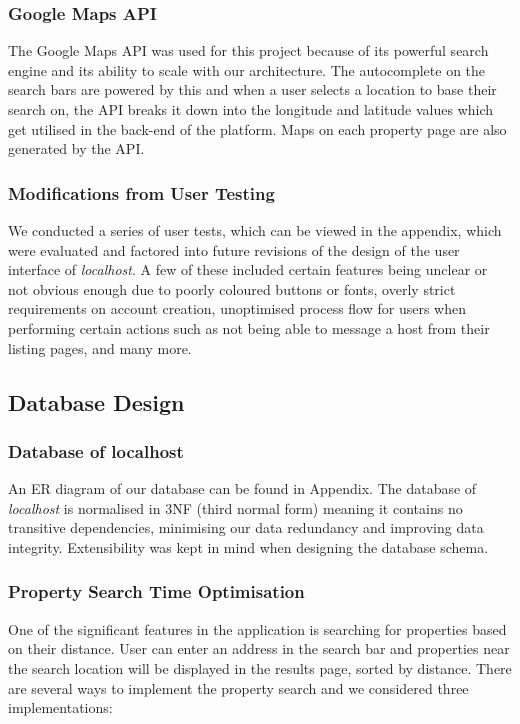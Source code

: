 \subsubsection{Google Maps API}
The Google Maps API was used for this project because of its powerful search
engine and its ability to scale with our architecture. The autocomplete on the
search bars are powered by this and when a user selects a location to base their
search on, the API breaks it down into the longitude and latitude values which
get utilised in the back-end of the platform. Maps on each property page are also
generated by the API.

\subsubsection{Modifications from User Testing}
We conducted a series of user tests, which can be viewed in the appendix, which
were evaluated and factored into future revisions of the design of the user
interface of \emph{localhost}. A few of these included certain features being
unclear or not obvious enough due to poorly coloured buttons or fonts, overly
strict requirements on account creation, unoptimised process flow for users when
performing certain actions such as not being able to message a host from their
listing pages, and many more.

\subsection{Database Design}

\subsubsection{Database of localhost}

An ER diagram of our database can be found in Appendix.
The database of \emph{localhost} is normalised in 3NF (third normal form) meaning it
contains no transitive dependencies, minimising our data redundancy and
improving data integrity. Extensibility was kept in mind when designing the
database schema.

\subsubsection{Property Search Time Optimisation}
One of the significant features in the application is searching for properties based on
their distance. User can enter an address in the search bar and properties
near the search location will be displayed in the results page, sorted by
distance. There are several ways to implement the property search and we considered
three implementations:

